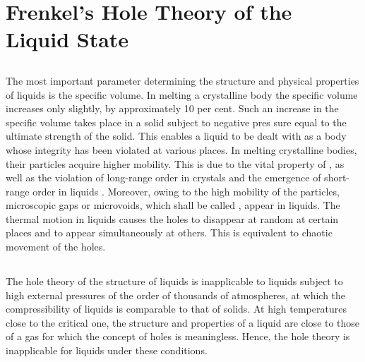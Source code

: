 \section{Frenkel's Hole Theory of the Liquid State}
\label{sec-13.2}

\subsection{}\label{13.2.1} The most important parameter determining the structure and physical properties of liquids is the specific volume. In melting a crystalline body the specific volume increases only slightly, by approximately 10 per cent. Such an increase in the specific volume takes place in a solid subject to negative pres­ sure equal to the ultimate strength  of the solid. This enables a liquid to be dealt with as a body whose integrity has been violated at various places. In melting crystalline bodies, their particles acquire higher mobility. This is due to the vital property of , as well as the violation of long-range order in crystals and the emergence of short-range order in liquids . Moreover, owing to the high mobility of the particles, microscopic gaps or microvoids, which shall be called , appear in liquids. The thermal motion in liquids causes the holes to disappear at random at certain places and to appear simultaneously at others. This is equivalent to chaotic movement of the holes.

\subsection{}\label{13.2.2} The hole theory of the structure of liquids is inapplicable to liquids subject to high external pressures of the order of thousands of atmospheres, at which the compressibility of liquids is comparable to that of solids. At high temperatures close to the critical one, the structure and properties of a liquid are close to those of a gas for which the concept of holes is meaningless. Hence, the hole theory is inapplicable for liquids under these conditions.

